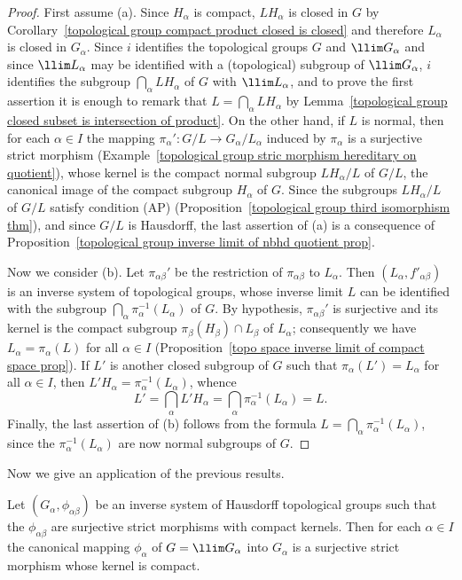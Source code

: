 \begin{proof}
First assume (a). Since $H_\alpha$ is compact, $LH_\alpha$ is closed in $G$ by Corollary~\ref{topological group compact product closed is closed} and therefore $L_\alpha$ is closed in $G_\alpha$. Since $i$ identifies the topological groups $G$ and $\llim G_\alpha$ and since $\llim L_\alpha$ may be identified with a (topological) subgroup of $\llim G_\alpha$, $i$ identifies the subgroup $\bigcap_\alpha LH_\alpha$ of $G$ with $\llim L_\alpha$, and to prove the first assertion it is enough to remark that $L=\bigcap_\alpha LH_\alpha$ by Lemma~\ref{topological group closed subset is intersection of product}. On the other hand, if $L$ is normal, then for each $\alpha\in I$ the mapping $\pi_\alpha':G/L\to G_\alpha/L_\alpha$ induced by $\pi_\alpha$ is a surjective strict morphism (Example~\ref{topological group stric morphism hereditary on quotient}), whose kernel is the compact normal subgroup $LH_\alpha/L$ of $G/L$, the canonical image of the compact subgroup $H_\alpha$ of $G$. Since the subgroups $LH_\alpha/L$ of $G/L$ satisfy condition (AP) (Proposition~\ref{topological group third isomorphism thm}), and since $G/L$ is Hausdorff, the last assertion of (a) is a consequence of Proposition~\ref{topological group inverse limit of nbhd quotient prop}.\par
Now we consider (b). Let $\pi_{\alpha\beta}'$ be the restriction of $\pi_{\alpha\beta}$ to $L_\alpha$. Then $(L_\alpha,f'_{\alpha\beta})$ is an inverse system of topological groups, whose inverse limit $L$ can be identified with the subgroup $\bigcap_\alpha\pi_\alpha^{-1}(L_\alpha)$ of $G$. By hypothesis, $\pi_{\alpha\beta}'$ is surjective and its kernel is the compact subgroup $\pi_\beta(H_\beta)\cap L_\beta$ of $L_\alpha$; consequently we have $L_\alpha=\pi_\alpha(L)$ for all $\alpha\in I$ (Proposition~\ref{topo space inverse limit of compact space prop}). If $L'$ is another closed subgroup of $G$ such that $\pi_\alpha(L')=L_\alpha$ for all $\alpha\in I$, then $L'H_\alpha=\pi_\alpha^{-1}(L_\alpha)$, whence
\[L'=\bigcap_\alpha L'H_\alpha=\bigcap_\alpha\pi_\alpha^{-1}(L_\alpha)=L.\]
Finally, the last assertion of (b) follows from the formula $L=\bigcap_\alpha\pi_\alpha^{-1}(L_\alpha)$, since the $\pi_\alpha^{-1}(L_\alpha)$ are now normal subgroups of $G$.
\end{proof}
Now we give an application of the previous results.
\begin{proposition}\label{topological group inverse limit surjective strict morphism}
Let $(G_\alpha,\phi_{\alpha\beta})$ be an inverse system of Hausdorff topological groups such that the $\phi_{\alpha\beta}$ are surjective strict morphisms with compact kernels. Then for each $\alpha\in I$ the canonical mapping $\phi_\alpha$ of $G=\llim G_\alpha$ into $G_\alpha$ is a surjective strict morphism whose kernel is compact.
\end{proposition}

